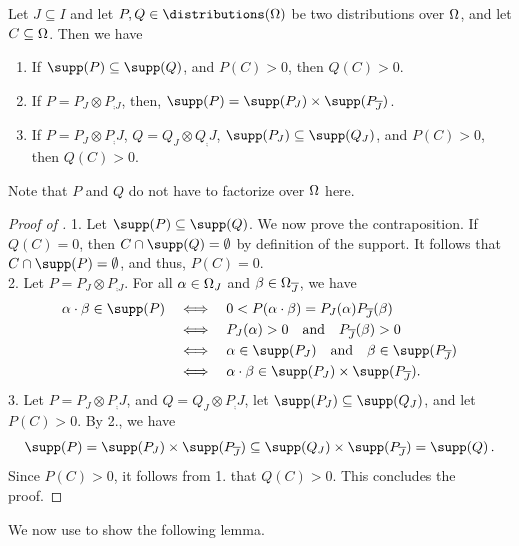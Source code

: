 \documentclass[USenglish,onecolumn]{article}
\begin{document}
\begin{lemma}
  \label{lemma:support_statements}
  Let $J \subseteq I$ and let $P, Q \in \distributions(\Omg)$ be two distributions over $\Omega$, and let $C \subseteq \Omega$.
  Then we have
  \begin{enumerate}
    \item If $\supp(P) \subseteq \supp(Q)$, and $P(C) > 0$, then $Q(C) > 0$.
    \item If $P = P_J \otimes P_{\comp{J}}$, 
      then, $\supp(P) = \supp(P_J) \times \supp(P_{\comp{J}})$.
      \item If $P=P_J\otimes P_\comp{J}$, $Q=Q_J\otimes Q_\comp{J}$,  $\supp(P_J)\subseteq\supp(Q_J)$, and $P(C)>0$, then $Q(C)>0$.
  \end{enumerate}
\end{lemma}
Note that $P$ and $Q$ do not have to factorize over $\Omega$ here.
\begin{proof}[Proof of ]
  1. Let $\supp(P)\subseteq\supp(Q)$. We now prove the contraposition.
  If $Q(C) = 0$, then $C \cap \supp(Q) = \emptyset$ by definition of the support. It follows that $C \cap \supp(P) = \emptyset$, and thus, $P(C) = 0$.
  \\2. Let $P = P_J \otimes P_{\comp{J}}$.
  For all $\alpha \in \Omega_J$ and $\beta \in \Omega_{{\overline{J}}}$, we have
  \begin{align*}
    \x \merge \y \in \supp(P) \quad & \Longleftrightarrow \quad 0 < P(\x \merge \y) = P_J(\x) P_{\comp{J}}(\y) \\
    & \Longleftrightarrow \quad
    P_J(\x) > 0 \text{ \ \ and \ \ } P_{\comp{J}}(\y) > 0 \\
    & \Longleftrightarrow \quad
    \x \in \supp(P_J) \text{ \ \ and \ \ } \y \in \supp(P_{\comp{J}}) \\
    & \Longleftrightarrow \quad
    \x \merge \y \in \supp(P_J) \times \supp(P_{\comp{J}}).
  \end{align*}
  3. Let $P=P_J\otimes P_\comp{J}$, and $Q=Q_J\otimes P_\comp{J}$, let $\supp(P_J)\subseteq\supp(Q_J)$, and let $P(C)>0$. By 2., we have
  \begin{equation}
  \supp(P)=\supp(P_J)\times\supp(P_\comp{J})\subseteq \supp(Q_J)\times \supp(P_\comp{J})=\supp(Q)\,.
  \end{equation}
  Since $P(C)>0$, it follows from 1. that $Q(C)>0$.
  This concludes the proof.
\end{proof}

We now use  to show the following lemma.
\end{document}
